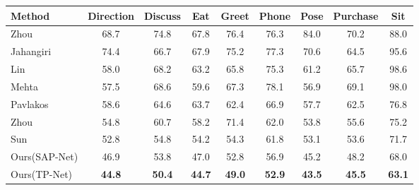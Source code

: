 \documentclass[runningheads]{llncs}
\begin{document}
\begin{table*}[t]
\centering
\begin{tabular}{l  c  c  c  c  c  c  c  c }
\hline
Method & Direction & Discuss & Eat & Greet & Phone & Pose & Purchase & Sit \\
\hline
\hline
Zhou~\cite{zhou2016sparseness} & 68.7 & 74.8 & 67.8 & 76.4 & 76.3 & 84.0 & 70.2 & 88.0 \\
Jahangiri~\cite{Jahangiri:ICCV2017} & 74.4 & 66.7 & 67.9 & 75.2 & 77.3 & 70.6 & 64.5 & 95.6 \\
Lin~\cite{Lin_2017_CVPR} & 58.0 & 68.2 & 63.2 & 65.8 & 75.3 & 61.2 & 65.7 & 98.6 \\
Mehta~\cite{mono-3dhp2017}  & 57.5 & 68.6 & 59.6 & 67.3 & 78.1 & 56.9 & 69.1 & 98.0 \\
Pavlakos~\cite{Pavlakos_2017_CVPR} & 58.6 & 64.6 & 63.7 & 62.4 & 66.9 & 57.7 & 62.5 & 76.8 \\
Zhou~\cite{Zhou_2017_ICCV} & 54.8 & 60.7 & 58.2 & 71.4 & 62.0 & 53.8 & 55.6 & 75.2 \\
Sun~\cite{Sun_2017_ICCV} & 52.8 & 54.8 & 54.2 & 54.3 & 61.8 & 53.1 & 53.6 & 71.7 \\
\hline
Ours(SAP-Net) & 46.9 & 53.8 & 47.0 & 52.8 & 56.9 & 45.2 & 48.2 & 68.0  \\
Ours(TP-Net) & \textbf{44.8} & \textbf{50.4} & \textbf{44.7} & \textbf{49.0} & \textbf{52.9} & \textbf{43.5} & \textbf{45.5} & \textbf{63.1} \\


\end{tabular}
\end{table*}
\end{document}
